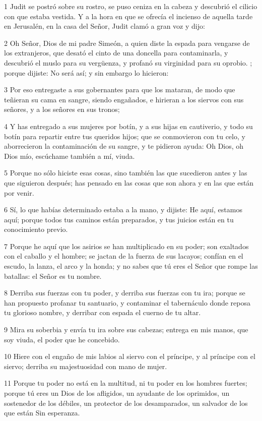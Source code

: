 \par 1 Judit se postró sobre su rostro, se puso ceniza en la cabeza y descubrió el cilicio con que estaba vestida. Y a la hora en que se ofrecía el incienso de aquella tarde en Jerusalén, en la casa del Señor, Judit clamó a gran voz y dijo:
\par 2 Oh Señor, Dios de mi padre Simeón, a quien diste la espada para vengarse de los extranjeros, que desató el cinto de una doncella para contaminarla, y descubrió el muslo para su vergüenza, y profanó su virginidad para su oprobio. ; porque dijiste: No será así; y sin embargo lo hicieron:
\par 3 Por eso entregaste a sus gobernantes para que los mataran, de modo que teñieran su cama en sangre, siendo engañados, e hirieran a los siervos con sus señores, y a los señores en sus tronos;
\par 4 Y has entregado a sus mujeres por botín, y a sus hijas en cautiverio, y todo su botín para repartir entre tus queridos hijos; que se conmovieron con tu celo, y aborrecieron la contaminación de su sangre, y te pidieron ayuda: Oh Dios, oh Dios mío, escúchame también a mí, viuda.
\par 5 Porque no sólo hiciste esas cosas, sino también las que sucedieron antes y las que siguieron después; has pensado en las cosas que son ahora y en las que están por venir.
\par 6 Sí, lo que habías determinado estaba a la mano, y dijiste: He aquí, estamos aquí; porque todos tus caminos están preparados, y tus juicios están en tu conocimiento previo.
\par 7 Porque he aquí que los asirios se han multiplicado en su poder; son exaltados con el caballo y el hombre; se jactan de la fuerza de sus lacayos; confían en el escudo, la lanza, el arco y la honda; y no sabes que tú eres el Señor que rompe las batallas: el Señor es tu nombre.
\par 8 Derriba sus fuerzas con tu poder, y derriba sus fuerzas con tu ira; porque se han propuesto profanar tu santuario, y contaminar el tabernáculo donde reposa tu glorioso nombre, y derribar con espada el cuerno de tu altar.
\par 9 Mira su soberbia y envía tu ira sobre sus cabezas; entrega en mis manos, que soy viuda, el poder que he concebido.
\par 10 Hiere con el engaño de mis labios al siervo con el príncipe, y al príncipe con el siervo; derriba su majestuosidad con mano de mujer.
\par 11 Porque tu poder no está en la multitud, ni tu poder en los hombres fuertes; porque tú eres un Dios de los afligidos, un ayudante de los oprimidos, un sostenedor de los débiles, un protector de los desamparados, un salvador de los que están Sin esperanza.
